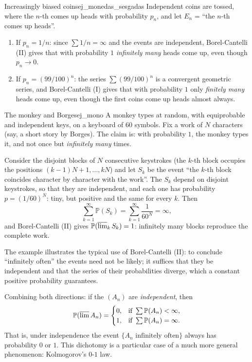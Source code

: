 \documentclass[11pt, a4paper]{article}
\begin{document}
\begin{ejemplo}{Increasingly biased coins}{ej_monedas_sesgadas}
Independent coins are tossed, where the $n$-th comes up heads with probability $p_n$, and let
$E_n$ = ``the $n$-th comes up heads''.
\begin{enumerate}
    \item If $p_n = 1/n$: since $\sum 1/n = \infty$ and the events are independent,
    Borel-Cantelli (II) gives that with probability $1$ \emph{infinitely many} heads come up, even though
    $p_n \to 0$.
    \item If $p_n = (99/100)^n$: the series $\sum (99/100)^n$ is a convergent geometric series, and
    Borel-Cantelli (I) gives that with probability $1$ only \emph{finitely many} heads come up, even though the
    first coins come up heads almost always.
\end{enumerate}
\end{ejemplo}

\begin{ejemplo}{The monkey and Borges}{ej_mono}
A monkey types at random, with equiprobable and independent keys, on a keyboard of $60$
symbols. Fix a work of $N$ characters (say, a short story by Borges). The claim is: with
probability $1$, the monkey types it, and not once but \emph{infinitely many} times.

Consider the disjoint blocks of $N$ consecutive keystrokes (the $k$-th block occupies the
positions $(k-1)N + 1, \dots, kN$) and let $S_k$ be the event ``the $k$-th block coincides
character by character with the work''. The $S_k$ depend on disjoint keystrokes, so that they are
independent, and each one has probability $p = (1/60)^N$: tiny, but positive and the
same for every $k$. Then
$$ \sum_{k=1}^\infty \mathbb{P}(S_k) = \sum_{k=1}^\infty \frac{1}{60^N} = \infty, $$
and Borel-Cantelli (II) gives $\mathbb{P}(\varlimsup_k S_k) = 1$: infinitely many blocks reproduce the
complete work.
\end{ejemplo}

\obs The example illustrates the typical use of Borel-Cantelli (II): to conclude ``infinitely
often'' the events need not be likely; it suffices that they be independent and that
the series of their probabilities diverge, which a constant positive probability guarantees.

\obs Combining both directions: if the $(A_n)$ are \emph{independent}, then
$$ \mathbb{P}(\varlimsup A_n) = \begin{cases} 0, & \text{if } \sum \mathbb{P}(A_n) < \infty, \\
1, & \text{if } \sum \mathbb{P}(A_n) = \infty. \end{cases} $$
That is, under independence the event $\{A_n \text{ infinitely often}\}$ always has
probability $0$ or $1$. This dichotomy is a particular case of a much more
general phenomenon: Kolmogorov's $0$-$1$ law.
\end{document}
